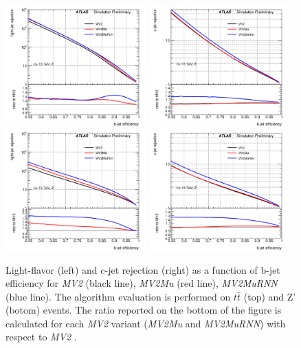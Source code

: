 \begin{figure}[htbp]
  \centering
 \includegraphics[width=0.48\textwidth]{figures/RNN/LRej_ttbar_combtagger.png}
 \includegraphics[width=0.48\textwidth]{figures/RNN/CRej_ttbar_combtagger.png}\\
 \includegraphics[width=0.48\textwidth]{figures/RNN/LRej_Zprime_combtagger.png}
 \includegraphics[width=0.48\textwidth]{figures/RNN/CRej_Zprime_combtagger.png}

 \caption{Light-flavor (left) and c-jet rejection (right) as a function of b-jet efficiency for \textit{MV2} (black line), \textit{MV2Mu} (red line), \textit{MV2MuRNN} (blue line). The algorithm evaluation is performed on $t\bar t$ (top) and Z' (botom) events. The ratio reported on the bottom of the figure is calculated for each \textit{MV2} variant (\textit{MV2Mu} and \textit{MV2MuRNN}) with respect to \textit{MV2} \cite{ATL-PHYS-PUB-2017-013}.}
  \label{fig:combtagger}
\end{figure}
